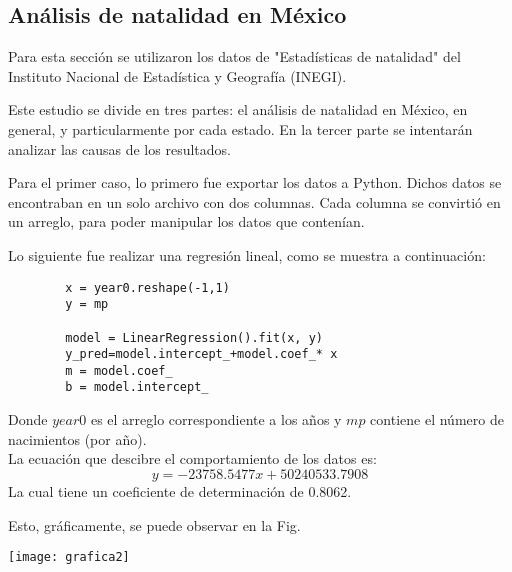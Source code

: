 \documentclass[11pt]{article}
\begin{document}
\begin{multicols}{2}
	\section{Análisis de natalidad en México}
	Para esta sección se utilizaron los datos de "Estadísticas de natalidad" del Instituto Nacional de Estadística y Geografía (INEGI).\par 
	Este estudio se divide en tres partes: el análisis de natalidad en México, en general, y particularmente por cada estado. En la tercer parte se intentarán analizar las causas de los resultados.\par 
	Para el primer caso, lo primero fue exportar los datos a Python. Dichos datos se encontraban en un solo archivo con dos columnas. Cada columna se convirtió en un arreglo, para poder manipular los datos que contenían.\par 
	Lo siguiente fue realizar una regresión lineal, como se muestra a continuación:
	\begin{verbatim}
		x = year0.reshape(-1,1)
		y = mp
		
		model = LinearRegression().fit(x, y)
		y_pred=model.intercept_+model.coef_* x
		m = model.coef_
		b = model.intercept_
	\end{verbatim}
	Donde $year0$ es el arreglo correspondiente a los años y $mp$ contiene el número de nacimientos (por año).\\
	La ecuación que descibre el comportamiento de los datos es:
	\begin{equation}\label{eq:1}
		y = -23758.5477x + 50240533.7908
	\end{equation}
	La cual tiene un coeficiente de determinación de 0.8062.\par 
	Esto, gráficamente, se puede observar en la Fig.
	
	\texttt{[image: grafica2]}\label{fig:2}
	

\end{multicols}
\end{document}
